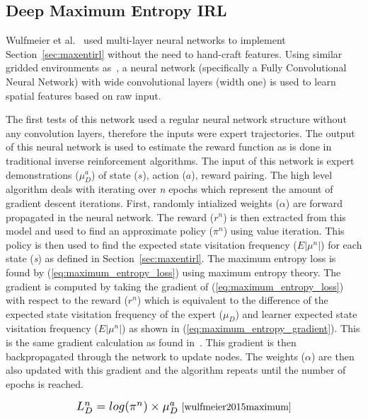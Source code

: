 \documentclass[12pt,american]{report}
\begin{document}
\label{sec:maxentdeepirl}
\subsection{Deep Maximum Entropy IRL}
Wulfmeier et al.~\cite{wulfmeier2015maximum} used multi-layer neural networks to implement Section~\ref{sec:maxentirl} without the need to hand-craft features. Using similar gridded environments as~\cite{ziebart2008maximum}, a neural network (specifically a Fully Convolutional Neural Network) with wide convolutional layers (width one) is used to learn spatial features based on raw input.  

The first tests of this network used a regular neural network structure without any convolution layers, therefore the inputs were expert trajectories. The output of this neural network is used to estimate the reward function as is done in traditional inverse reinforcement algorithms. The input of this network is expert demonstrations ($\mu_{D}^{a}$) of state ($s$), action ($a$), reward pairing. The high level algorithm deals with iterating over \textit{n} epochs which represent the amount of gradient descent iterations. First, randomly intialized weights ($\alpha$) are forward propagated in the neural network.  The reward ($r^n$) is then extracted from this model and used to find an approximate policy ($\pi^n$) using value iteration. This policy is then used to find the expected state visitation frequency ($E|\mu^n|$) for each state (\textit{s}) as defined in Section~\ref{sec:maxentirl}.  The maximum entropy loss is found by (\ref{eq:maximum_entropy_loss}) using maximum entropy theory. The gradient is computed by taking the gradient of (\ref{eq:maximum_entropy_loss}) with respect to the reward ($r^n$) which is equivalent to the difference of the expected state visitation frequency of the expert ($\mu_D$) and learner expected state visitation frequency ($E|\mu^n|$) as shown in (\ref{eq:maximum_entropy_gradient}).  This is the same gradient calculation as found in~\cite{ziebart2008maximum}.  This gradient is then backpropagated through the network to update nodes.  The weights ($\alpha$) are then also updated with this gradient and the algorithm repeats until the number of epochs is reached. 

\begin{equation}
            \label{eq:maximum_entropy_loss}
            \resizebox{0.3\textwidth}{!}{$L_{D}^{n}=log(\pi^n) \times \mu_{D}^{a} $}~\cite{wulfmeier2015maximum}%
        \end{equation}
\end{document}
